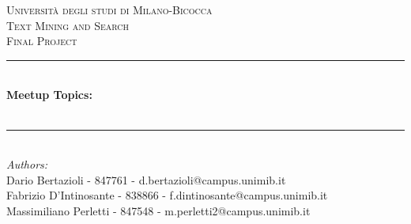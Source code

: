 \documentclass[10pt]{article}
\begin{document}
\begin{titlepage}

\newcommand{\HRule}{\rule{\linewidth}{0.5mm}} %

\center %
 

\textsc{\LARGE Università degli studi di Milano-Bicocca}\\[1cm] %
\textsc{\Large Text Mining and Search}\\[0.3cm] %
\textsc{\large Final Project}\\[0.1cm] %

\HRule \\[0.4cm]
{ \huge \bfseries Meetup Topics: \\ \vspace{0.2cm}{\Large Classify Meetup.com Event Descriptions}}\\[0.4cm] %
\HRule \\[1.5cm]
 

\large
\emph{Authors:}\\
Dario Bertazioli - 847761 - d.bertazioli@campus.unimib.it \\   %
Fabrizio D'Intinosante - 838866 - f.dintinosante@campus.unimib.it \\
Massimiliano Perletti - 847548 - m.perletti2@campus.unimib.it\\[1cm] %


\end{titlepage}
\end{document}
